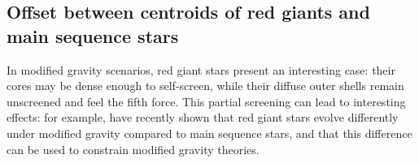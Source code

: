 \documentclass[useAMS,usenatbib,twocolumn]{mn2e}
\begin{document}
% 







\subsection{Offset between centroids of red giants and main sequence stars}
\label{sec:rgb}
In modified gravity scenarios, red giant stars present an interesting case:
their cores may be dense enough to self-screen, while their diffuse outer
shells remain unscreened and feel the fifth force.  This partial screening
can lead to interesting effects: for example, 
\citet{changhui} have recently shown that red giant stars evolve differently
under modified gravity compared to main sequence stars, and that this
difference can be used to constrain modified gravity theories.
\end{document}
